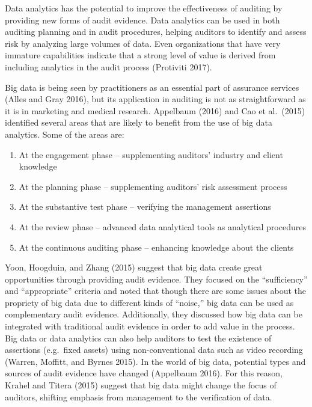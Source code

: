 \documentclass[
]{book}
\providecommand{\tightlist}{%
  \setlength{\itemsep}{0pt}\setlength{\parskip}{0pt}}
\begin{document}
Data analytics has the potential to improve the effectiveness of auditing by providing new forms of audit evidence. Data analytics can be used in both auditing planning and in audit procedures, helping auditors to identify and assess risk by analyzing large volumes of data. Even organizations that have very immature capabilities indicate that a strong level of value is derived from including analytics in the audit process (Protiviti 2017).

Big data is being seen by practitioners as an essential part of assurance services (Alles and Gray 2016), but its application in auditing is not as straightforward as it is in marketing and medical research. Appelbaum (2016) and Cao et al.~(2015) identified several areas that are likely to benefit from the use of big data analytics. Some of the areas are:

\begin{enumerate}
\def\labelenumi{\alph{enumi})}
\tightlist
\item
  At the engagement phase -- supplementing auditors' industry and client knowledge
\item
  At the planning phase -- supplementing auditors' risk assessment process
\item
  At the substantive test phase -- verifying the management assertions
\item
  At the review phase -- advanced data analytical tools as analytical procedures
\item
  At the continuous auditing phase -- enhancing knowledge about the clients
\end{enumerate}

Yoon, Hoogduin, and Zhang (2015) suggest that big data create great opportunities through providing audit evidence. They focused on the ``sufficiency'' and ``appropriate'' criteria and noted that though there are some issues about the propriety of big data due to different kinds of ``noise,'' big data can be used as complementary audit evidence. Additionally, they discussed how big data can be integrated with traditional audit evidence in order to add value in the process. Big data or data analytics can also help auditors to test the existence of assertions (e.g.~fixed assets) using non-conventional data such as video recording (Warren, Moffitt, and Byrnes 2015). In the world of big data, potential types and sources of audit evidence have changed (Appelbaum 2016). For this reason, Krahel and Titera (2015) suggest that big data might change the focus of auditors, shifting emphasis from management to the verification of data.
\end{document}
